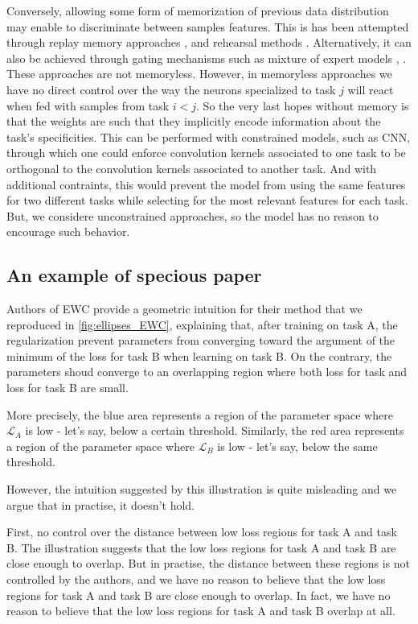 \documentclass[11pt]{article}
\begin{document}
\vspace{1mm}
\noindent
Conversely, allowing some form of memorization of previous data distribution may enable to discriminate between samples features. This is has been attempted through replay memory approaches \cite{replay1}, \cite{replay2} and rehearsal methods \cite{rehearsal}. Alternatively, it can also be achieved through gating mechanisms such as mixture of expert models \cite{moe}, \cite{dmoe}. These approaches are not memoryless. However, in memoryless approaches we have no direct control over the way the neurons specialized to task $j$ will react when fed with samples from task $i<j$. So the very last hopes without memory is that the weights are such that they implicitly encode information about the task's specificities. This can be performed with constrained models, such as CNN, through which one could enforce convolution kernels associated to one task to be orthogonal to the convolution kernels associated to another task. And with additional contraints, this would prevent the model from using the same features for two different tasks while selecting for the most relevant features for each task. But, we considere unconstrained approaches, so the model has no reason to encourage such behavior.



\subsection{An example of specious paper}

\vspace{1mm}
\noindent
Authors of EWC provide a geometric intuition for their method that we reproduced in \ref{fig:ellipses_EWC}, explaining that, after training on task A, the regularization prevent parameters from converging toward the argument of the minimum of the loss for task B when learning on task B. On the contrary, the parameters shoud converge to an overlapping region where both loss for task and loss for task B are small.

More precisely, the blue area represents a region of the parameter space where $\mathcal{L}_A$ is low - let's say, below a certain threshold. Similarly, the red area represents a region of the parameter space where $\mathcal{L}_B$ is low - let's say, below the same threshold. 

However, the intuition suggested by this illustration is quite misleading and we argue that in practise, it doesn't hold.

\vspace{1mm}
\noindent
First, no control over the distance between low loss regions for task A and task B. The illustration suggests that the low loss regions for task A and task B are close enough to overlap. But in practise, the distance between these regions is not controlled by the authors, and we have no reason to believe that the low loss regions for task A and task B are close enough to overlap. In fact, we have no reason to believe that the low loss regions for task A and task B overlap at all.
\end{document}
